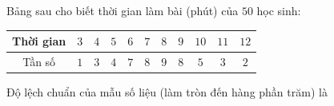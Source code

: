 \begin{ex}
Bảng sau cho biết thời gian làm bài (phút) của $50$ học sinh:
\begin{center}
\begin{tabular}{|c|c|c|c|c|c|c|c|c|c|c|}\hline
Thời gian & $3$ & $4$ & $5$ & $6$ & $7$ & $8$ & $9$ & $10$ & $11$ & $12$\\\hline
Tần số & $1$ & $3$ & $4$ & $7$ & $8$ & $9$ & $8$ & $5$ & $3$ & $2$\\\hline
\end{tabular}
\end{center}
Độ lệch chuẩn của mẫu số liệu (làm tròn đến hàng phần trăm) là
\end{ex}
